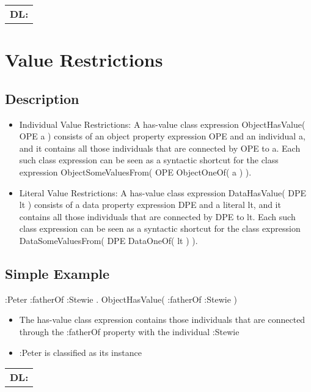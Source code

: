 \documentclass{llncs}
\newenvironment{DL}{
  \scriptsize
  \sffamily
  \vspace{0.3cm}
  \begin{tabular}{l}
	\textbf{DL:} \\

}{
  \end{tabular}
  \linebreak
}
\newcommand{\tb}[1]{\todo[size=\small, color=blue!40]{\textbf{Thomas:} #1}}
\begin{document}
\begin{DL}

\end{DL}

\tb{ToDo: DL}

\section{Value Restrictions}

\subsection{Description}

\begin{itemize}
	\item Individual Value Restrictions: A has-value class expression ObjectHasValue( OPE a ) consists of an object property expression OPE and an individual a, and it contains all those individuals that are connected by OPE to a. Each such class expression can be seen as a syntactic shortcut for the class expression ObjectSomeValuesFrom( OPE ObjectOneOf( a ) ). 
	\item Literal Value Restrictions: A has-value class expression DataHasValue( DPE lt ) consists of a data property expression DPE and a literal lt, and it contains all those individuals that are connected by DPE to lt. Each such class expression can be seen as a syntactic shortcut for the class expression DataSomeValuesFrom( DPE DataOneOf( lt ) ).
\end{itemize}

\subsection{Simple Example}

\begin{ex}
:Peter :fatherOf :Stewie . 
ObjectHasValue( :fatherOf :Stewie )
\end{ex}

\begin{itemize}
	\item The has-value class expression contains those individuals that are connected through the :fatherOf property with the individual :Stewie
  \item :Peter is classified as its instance
\end{itemize}

\begin{DL}

\end{DL}
\end{document}
